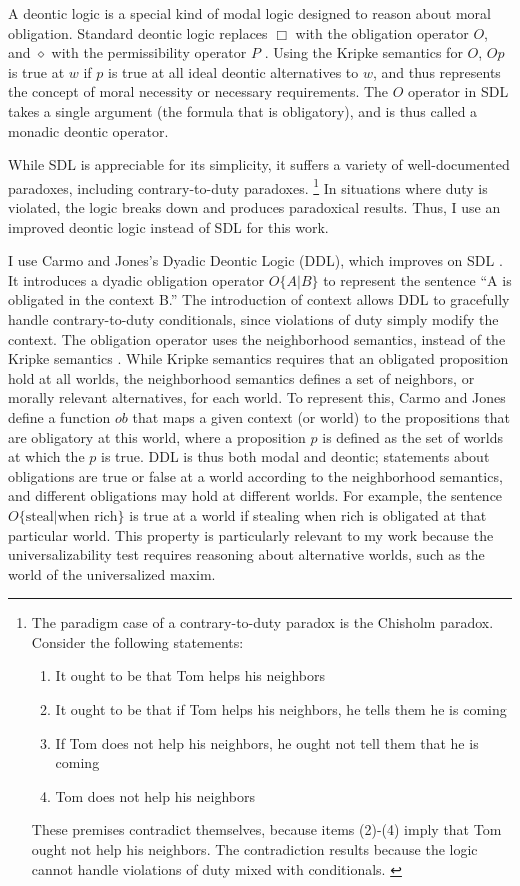 \begin{isabellebody}
\begin{isamarkuptext}
A deontic logic is a special kind of modal logic designed to reason about moral obligation. Standard deontic
logic replaces $\Box$ with the obligation operator
$O$, and $\diamond$ with the permissibility operator $P$ \citep{cresswell}. Using the Kripke semantics for $O$, $O p$ 
is true at $w$ if $p$ is true at all  ideal deontic alternatives to $w$, and thus represents the 
concept of moral necessity or necessary requirements. The $O$ operator in SDL
takes a single argument (the formula that is obligatory), and is thus called a monadic deontic operator.

 While SDL is appreciable for its simplicity, it suffers a variety of well-documented paradoxes, 
including contrary-to-duty paradoxes. \footnote{The paradigm case of a contrary-to-duty paradox is the 
Chisholm paradox. Consider the following statements: \begin{enumerate}
\item It ought to be that Tom helps his neighbors
\item It ought to be that if Tom helps his neighbors, he tells them he is coming
\item If Tom does not help his neighbors, he ought not tell them that he is coming
\item Tom does not help his neighbors
\end{enumerate} 
These premises contradict themselves, because items (2)-(4) imply that Tom ought not help his neighbors. The 
contradiction results because the logic cannot handle violations of duty mixed with
conditionals. \citep{chisholm, ctd}
} In situations where duty is violated, the logic breaks down 
and produces paradoxical results. Thus, I use an improved deontic logic instead of SDL for this work.

I use Carmo and Jones's Dyadic Deontic Logic (DDL), which improves on SDL \citep{CJDDL}. 
It introduces a dyadic obligation operator $O\{A \vert B\}$ 
to represent the sentence ``A is obligated in the context B.'' The introduction of context allows DDL to
gracefully handle contrary-to-duty conditionals, since violations of duty simply modify the context. The obligation operator uses 
the neighborhood semantics, instead of the Kripke semantics \citep{neighborhood1, neighborhood2}. While Kripke
semantics requires that an obligated proposition hold at all worlds, the neighborhood semantics defines
a set of neighbors, or morally relevant alternatives, for each world. To represent this,
Carmo and Jones define a function $ob$ that maps a given context (or world) to the propositions 
that are obligatory at this world, where a proposition $p$ is defined as 
the set of worlds at which the $p$ is true. DDL is thus both modal and deontic; statements about obligations are
true or false at a world according to the neighborhood 
semantics, and different obligations may hold at different worlds. For example, the 
sentence $O \{ \text{steal} \vert \text{when rich}\}$ is true at a world if stealing when rich is 
obligated at that particular world. This property is particularly relevant to my work because the universalizability test
requires reasoning about alternative worlds, such as the world of the universalized maxim.


\end{isamarkuptext}
\end{isabellebody}
